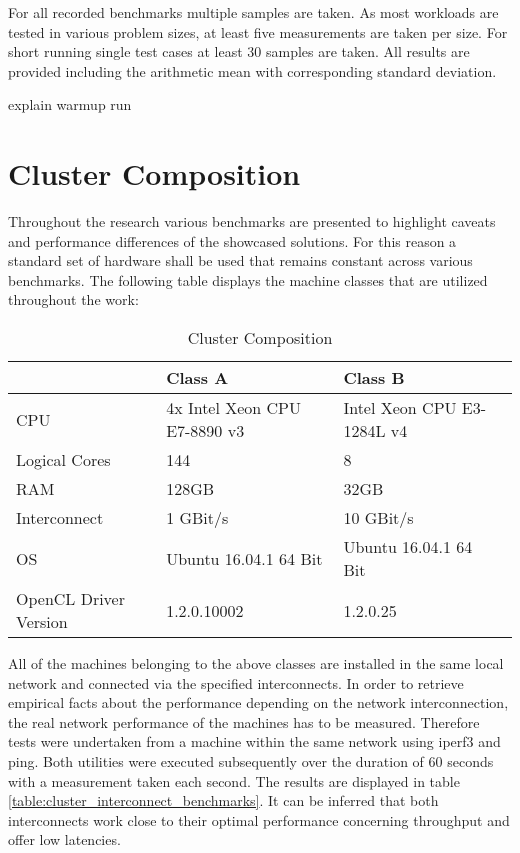 For all recorded benchmarks multiple samples are taken. As most workloads are tested in various problem sizes, at least five measurements are taken per size. For short running single test cases at least 30 samples are taken. All results are provided including the arithmetic mean with corresponding standard deviation.


explain warmup run

\section{Cluster Composition}
\label{cluster_composition}
Throughout the research various benchmarks are presented to highlight caveats and performance differences of the showcased solutions. For this reason a standard set of hardware shall be used that remains constant across various benchmarks. The following table displays the machine classes that are utilized throughout the work:

\begin{table}[htb]
	\centering
	\begin{adjustbox}{width=0.7\textwidth}
		\small
		\begin{tabular}{l | l | l | l}
			~                     & Class A                  	& Class B                  \\
			\hline
			CPU                   &  4x Intel Xeon CPU E7-8890 v3 	& Intel Xeon CPU E3-1284L v4 \\
			Logical Cores         &  144 	& 8 \\
			RAM                   &  128GB                       	& 32GB                       \\
			Interconnect          &  1 GBit/s                  	& 10 GBit/s                  \\
			OS                    &  Ubuntu 16.04.1 64 Bit      	& Ubuntu 16.04.1 64 Bit      \\
			OpenCL Driver Version &  1.2.0.10002                   & 1.2.0.25                   \\
		\end{tabular}
	\end{adjustbox}
	
	\caption{Cluster Composition}
	\label{table:cluster_setup_1}
\end{table}

All of the machines belonging to the above classes are installed in the same local network and connected via the specified interconnects. In order to retrieve empirical facts about the performance depending on the network interconnection, the real network performance of the machines has to be measured. Therefore tests were undertaken from a machine within the same network using iperf3 and ping. Both utilities were executed subsequently over the duration of 60 seconds with a measurement taken each second. The results are displayed in table \ref{table:cluster_interconnect_benchmarks}. It can be inferred that both interconnects work close to their optimal performance concerning throughput and offer low latencies.

